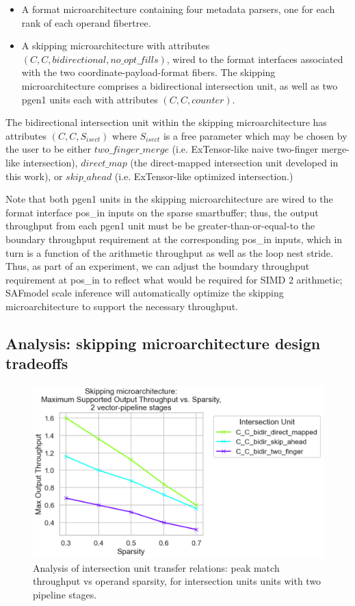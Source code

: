 \begin{itemize}
    \item A format microarchitecture containing four metadata parsers, one for each rank of each operand fibertree.
    \item A skipping microarchitecture with attributes $(C,C,bidirectional,no\_opt\_fills)$, wired to the format interfaces associated with the two coordinate-payload-format fibers. The skipping microarchitecture comprises a bidirectional intersection unit, as well as two pgen1 units each with attributes $(C,C,counter)$.
\end{itemize}

The bidirectional intersection unit within the skipping microarchitecture has attributes $(C,C,S_{isect})$ where $S_{isect}$ is a free parameter which may be chosen by the user to be either $two\_finger\_merge$ (i.e. ExTensor-like\cite{extensor} naive two-finger merge-like intersection), $direct\_map$ (the direct-mapped intersection unit developed in this work), or $skip\_ahead$ (i.e. ExTensor-like optimized intersection.)

Note that both pgen1 units in the skipping microarchitecture are wired to the format interface pos\_in inputs on the sparse smartbuffer; thus, the output throughput from each pgen1 unit must be be greater-than-or-equal-to the boundary throughput requirement at the corresponding pos\_in inputs, which in turn is a function of the arithmetic throughput as well as the loop nest stride. Thus, as part of an experiment, we can adjust the boundary throughput requirement at pos\_in to reflect what would be required for SIMD 2 arithmetic; SAFmodel scale inference will automatically optimize the skipping microarchitecture to support the necessary throughput.

\subsection{Analysis: skipping microarchitecture design tradeoffs}

\begin{figure}[H]
\includegraphics[width=\textwidth]{figures/skip_uarch_pipe_2.png}
\caption{Analysis of intersection unit transfer relations: peak match throughput vs operand sparsity, for intersection units units with two pipeline stages.}
\label{fig:skip_uarch_pipe_2}
\end{figure}

